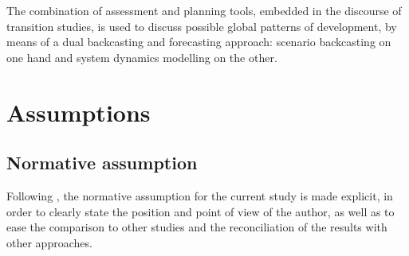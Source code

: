 The combination of assessment and planning tools, embedded in the discourse of transition studies, is used to discuss possible global patterns of development, by means of a dual backcasting and forecasting approach: scenario backcasting on one hand and system dynamics modelling on the other.

\section{Assumptions}
\label{s:methods:assumptions}


\subsection{Normative assumption}
\label{ss:methods:normative-assumption}

Following \textcite{creutzig2015_EvolvingNarrativesLow}, the normative assumption for the current study is made explicit, in order to clearly state the position and point of view of the author, as well as to ease the comparison to other studies and the reconciliation of the results with other approaches.


